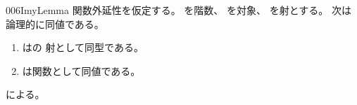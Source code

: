 \documentclass[index]{subfiles}
\begin{document}
\begin{myBlock}{006I}{myLemma}
  関数外延性を仮定する。
  を階数、
  を対象、
  を射とする。
  次は論理的に同値である。
  \begin{enumerate}
  \item \label{006I:0000} はの
    射として同型である。
  \item \label{006I:0001} は関数として同値である。
  \end{enumerate}
\end{myBlock}
\begin{myProof}
  による。
\end{myProof}
\end{document}
